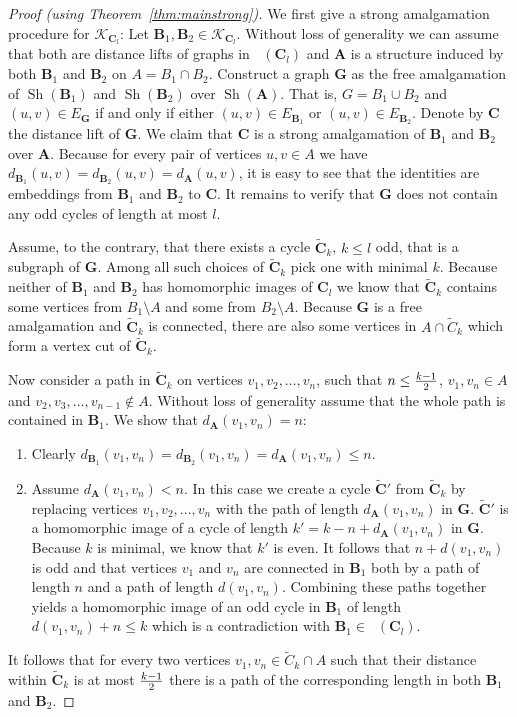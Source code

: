 \documentclass{elsarticle}
\def\Forb{\mathop{\mathrm{Forb_{he}}}\nolimits}
\def\sh{\mathop{\mathrm{Sh}}\nolimits}
\def\str#1{\mathbf {#1}}
\def\K{{\mathcal K}}
\theoremstyle{plain}
\theoremstyle{definition}
\theoremstyle{remark}
\begin{document}
\begin{proof}[Proof (using Theorem~\ref{thm:mainstrong})]
We first give a strong amalgamation procedure for $\K_{\str C_l}$: Let $\str{B}_1,\str{B}_2\in \K_{\str C_l}$. Without loss of generality we can assume that both are distance lifts of graphs in $\Forb(\str{C}_l)$ and $\str{A}$ is a structure induced by both $\str{B}_1$ and $\str{B}_2$ on $A=B_1\cap B_2$.
Construct a graph $\str{G}$ as the free amalgamation of $\sh(\str{B}_1)$ and
$\sh(\str{B}_2)$ over $\sh(\str{A})$. That is, $G=B_1\cup B_2$ and $(u,v)\in
E_\str{G}$ if and only if either $(u,v)\in E_{\str{B}_1}$ or $(u,v)\in
E_{\str{B}_2}$. Denote by $\str{C}$ the distance lift of $\str{G}$. We claim that $\str{C}$ is a strong amalgamation of $\str{B}_1$ and $\str{B}_2$ over $\str{A}$.
Because for every pair of vertices $u,v\in A$ we have $d_{\str{B}_1}(u,v)=d_{\str{B}_2}(u,v)=d_\str{A}(u,v)$,
 it is easy to see that the identities are embeddings from $\str{B}_1$ and $\str{B}_2$ to $\str{C}$.  It remains to verify that $\str{G}$ does not contain any odd cycles of
length at most $l$.

Assume, to the contrary, that there exists a cycle
$\widetilde{\str{C}}_k$, $k\leq l$ odd, that is a subgraph of
$\str{G}$.  Among all such choices of $\widetilde{\str{C}}_k$ pick one
with minimal $k$.  Because neither of $\str{B}_1$ and $\str{B}_2$ has 
homomorphic images of $\str{C}_l$ we know that $\widetilde{\str{C}}_k$ contains some
vertices from $B_1\setminus A$  and some from $B_2\setminus A$. Because $\str{G}$ is a free amalgamation
and $\widetilde{\str{C}}_k$ is connected, there are also some vertices in $A\cap \widetilde{C}_k$ which form a vertex cut of $\widetilde{\str{C}}_k$.

Now consider a path
in $\widetilde{\str{C}}_k$ on vertices $v_1,v_2,\ldots, v_n$, such that $n\leq {k-1\over 2}$, $v_1,v_n\in A$
and $v_2,v_3,\ldots,v_{n-1}\notin A$. Without loss of generality assume that the whole path is contained in $\str{B}_1$.
We show that $d_\str{A}(v_1,v_n)=n$:
\begin{enumerate}
 \item Clearly $d_{\str{B}_1}(v_1,v_n)=d_{\str{B}_2}(v_1,v_n)=d_\str{A}(v_1,v_n)\leq n$.
\item Assume $d_\str{A}(v_1,v_n)<n$. In this case we create a cycle $\widetilde{\str{C}}'$ from $\widetilde{\str{C}}_k$ by replacing vertices $v_1,v_2,\ldots, v_n$ with the path
of length $d_\str{A}(v_1,v_n)$ in $\str{G}$. $\widetilde{\str{C}}'$ is a homomorphic image of a cycle of length $k'=k-n+d_\str{A}(v_1,v_n)$ in $\str{G}$. Because $k$ is minimal, we know that $k'$ is even.
It follows that $n+d(v_1,v_n)$ is odd and that vertices $v_1$ and $v_n$ are connected in $\str{B}_1$ both by a path of length $n$ and a path of length $d(v_1,v_n)$.
 Combining these paths together yields
a homomorphic image of an odd cycle in $\str{B}_1$ of length $d(v_1,v_n)+n\leq k$ which is a contradiction
with $\str{B}_1\in \Forb(\str{C}_l)$.
\end{enumerate}
It follows that for every two vertices $v_1,v_n\in \widetilde{C}_k\cap A$ such that their distance within $\widetilde{\str{C}}_k$
is at most $k-1\over 2$ there is a path of the corresponding length in both $\str{B}_1$
and $\str{B}_2$.


\end{proof}
\end{document}
